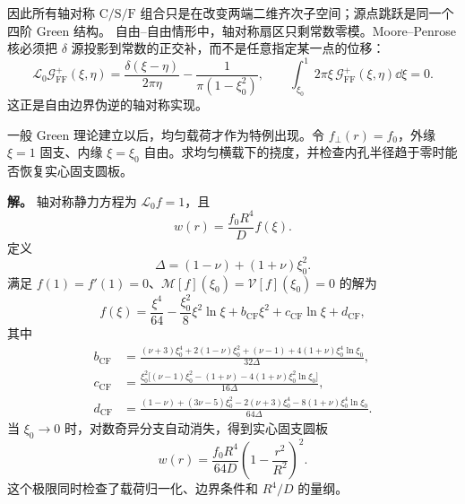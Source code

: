 因此所有轴对称 \(\mathrm C/\mathrm S/\mathrm F\) 组合只是在改变两端二维齐次子空间；源点跳跃是同一个四阶 Green 结构。
自由--自由情形中，轴对称扇区只剩常数零模。Moore--Penrose 核必须把 \(\delta\) 源投影到常数的正交补，而不是任意指定某一点的位移：
\begin{equation}
 \mathcal L_0\mathcal G_{\mathrm{FF}}^{+}(\xi,\eta)
 =\frac{\delta(\xi-\eta)}{2\pi\eta}
 -\frac{1}{\pi(1-\xi_0^2)},
 \qquad
 \int_{\xi_0}^{1}2\pi\xi\,
 \mathcal G_{\mathrm{FF}}^{+}(\xi,\eta)\dd\xi=0.
 \label{eq:phys-sm-axisym-ff-pseudoinverse}
\end{equation}
这正是自由边界伪逆的轴对称实现。
\begin{exbox}
一般 Green 理论建立以后，均匀载荷才作为特例出现。令 \(f_\perp(r)=f_0\)，外缘 \(\xi=1\) 固支、内缘 \(\xi=\xi_0\) 自由。求均匀横载下的挠度，并检查内孔半径趋于零时能否恢复实心固支圆板。

\textbf{解。} 轴对称静力方程为 \(\mathcal L_0f=1\)，且
\[
 w(r)=\frac{f_0R^4}{D}f(\xi).
\]
定义
\[
 \Delta=(1-\nu)+(1+\nu)\xi_0^2.
\]
满足 \(f(1)=f'(1)=0\)、\(\mathcal M[f](\xi_0)=\mathcal V[f](\xi_0)=0\) 的解为
\begin{equation}
 f(\xi)=\frac{\xi^4}{64}
 -\frac{\xi_0^2}{8}\xi^2\ln\xi
 +b_{\mathrm{CF}}\xi^2+c_{\mathrm{CF}}\ln\xi+d_{\mathrm{CF}},
 \label{eq:phys-sm-cf-uniform-deflection}
\end{equation}
其中
\begin{align*}
 b_{\mathrm{CF}}
 &=\frac{(\nu+3)\xi_0^4+2(1-\nu)\xi_0^2+(\nu-1)
 +4(1+\nu)\xi_0^4\ln\xi_0}{32\Delta},\\
 c_{\mathrm{CF}}
 &=\frac{\xi_0^2\bigl[(\nu-1)\xi_0^2-(1+\nu)
 -4(1+\nu)\xi_0^2\ln\xi_0\bigr]}{16\Delta},\\
 d_{\mathrm{CF}}
 &=\frac{(1-\nu)+(3\nu-5)\xi_0^2-2(\nu+3)\xi_0^4
 -8(1+\nu)\xi_0^4\ln\xi_0}{64\Delta}.
\end{align*}
当 \(\xi_0\to0\) 时，对数奇异分支自动消失，得到实心固支圆板
\[
 w(r)=\frac{f_0R^4}{64D}
 \left(1-\frac{r^2}{R^2}\right)^2.
\]
这个极限同时检查了载荷归一化、边界条件和 \(R^4/D\) 的量纲。
\end{exbox}
